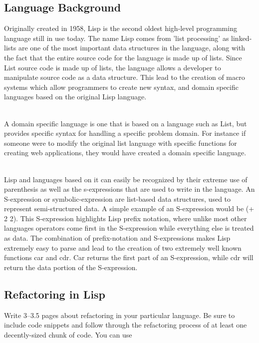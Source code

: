 \documentclass{article}
\begin{document}

\subsection*{Language Background}

Originally created in 1958, Lisp is the second oldest high-level programming language still in use today. The name Lisp comes from 'list processing' as linked-lists are one of the most important data structures in the language, along with the fact that the entire source code for the language is made up of lists. Since List source code is made up of lists, the language allows a developer to manipulate source code as a data structure. This lead to the creation of macro systems which allow programmers to create new syntax, and domain specific languages based on the original Lisp language.

\\A domain specific language is one that is based on a language such as List, but provides specific syntax for handling a specific problem domain. For instance if someone were to modify the original list language with specific functions for creating web applications, they would have created a domain specific language.

\\Lisp and languages based on it can easily be recognized by their extreme use of parenthesis as well as the s-expressions that are used to write in the language. An S-expression or symbolic-expression are list-based data structures, used to represent semi-structured data. A simple example of an S-expression would be (+ 2 2). This S-expression highlights Lisp prefix notation, where unlike most other languages operators come first in the S-expression while everything else is treated as data. The combination of prefix-notation and S-expressions makes Lisp extremely easy to parse and lead to the creation of two extremely well known functions car and cdr. Car returns the first part of an S-expression, while cdr will return the data portion of the S-expression.


\subsection*{Refactoring in Lisp}

Write 3--3.5 pages about refactoring in your particular language. Be sure to include code snippets and follow through the refactoring process of at least one decently-sized chunk of code. You can use
\end{document}
